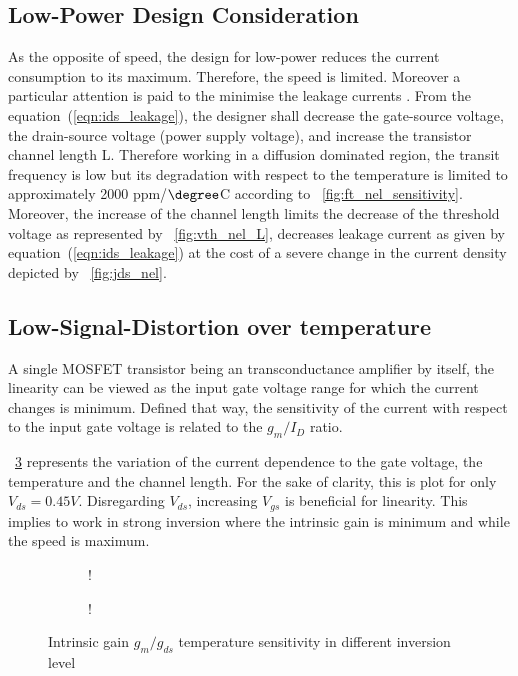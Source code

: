 \subsection{Low-Power Design Consideration}
As the opposite of speed, the design for low-power reduces the current consumption to its maximum. Therefore, the speed is limited. Moreover a particular attention is paid to the minimise the leakage currents%
. From the equation~(\ref{eqn:ids_leakage}), the designer shall decrease the gate-source voltage, the drain-source voltage (power supply voltage), and increase the transistor channel length L. Therefore working in a diffusion dominated region, the transit frequency is low but its degradation with respect to the temperature is limited to approximately 2000 ppm/\(\degree \)C according to \figurename~\ref{fig:ft_nel_sensitivity}. Moreover, the increase of the channel length limits the decrease of the threshold voltage as represented by \figurename~\ref{fig:vth_nel_L}, decreases leakage current as given by equation~(\ref{eqn:ids_leakage}) at the cost of a severe change in the current density depicted by \figurename~\ref{fig:jds_nel}.

\subsection{Low-Signal-Distortion over temperature}
A single MOSFET transistor being an transconductance amplifier by itself, the linearity can be viewed as the input gate voltage range for which the current changes is minimum. Defined that way, the sensitivity of the current with respect to the input gate voltage is related to the \(g_m/I_D \) ratio.

\figurename~\ref{fig:gm_id} represents the variation of the current dependence to the gate voltage, the temperature and the channel length. For the sake of clarity, this is plot for only \(V_{ds} = 0.45 V\). Disregarding \(V_{ds}\), increasing \(V_{gs}\) is beneficial for linearity. This implies to work in strong inversion where the intrinsic gain is minimum and while the speed is maximum. 

\begin{figure}[!ht]
    \centering
    \begin{subfigure}[b]{0.48\textwidth}
        \resizebox {\textwidth} {!} { 
            
        }
        \label{fig:gm_nel_T}
    \end{subfigure}
    \begin{subfigure}[b]{0.48\textwidth}
        \resizebox {\textwidth} {!} { 
            
        }
        \label{fig:gm_nel_L}
    \end{subfigure}
    \caption{Intrinsic gain \(g_m/g_{ds} \) temperature sensitivity in different inversion level}
    \label{fig:gm_id}
\end{figure}

